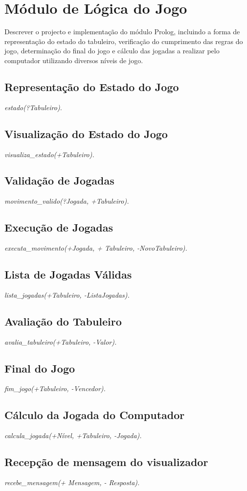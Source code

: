 \documentclass[15pt,a4paper]{article}
\begin{document}
\section{Módulo de Lógica do Jogo}
Descrever o projecto e implementação do módulo Prolog, incluindo a forma de representação do estado do tabuleiro,  verificação do cumprimento das regras do jogo, determinação do final do jogo e cálculo das jogadas a realizar pelo computador  utilizando diversos níveis de jogo.

\subsection{Representação do Estado do Jogo} \textit{estado(?Tabuleiro).}
\subsection{Visualização do Estado do Jogo} \textit{visualiza\_estado(+Tabuleiro).}
\subsection{Validação de Jogadas} \textit{movimento\_valido(?Jogada, +Tabuleiro).}
\subsection{Execução de Jogadas}\textit{executa\_movimento(+Jogada, + Tabuleiro, -NovoTabuleiro).}
\subsection{Lista de Jogadas Válidas}\textit{lista\_jogadas(+Tabuleiro, -ListaJogadas).}
\subsection{Avaliação do Tabuleiro}\textit{avalia\_tabuleiro(+Tabuleiro, -Valor).}
\subsection{Final do Jogo} \textit{fim\_jogo(+Tabuleiro, -Vencedor).}
\subsection{Cálculo da Jogada do Computador}\textit{calcula\_jogada(+Nível, +Tabuleiro, -Jogada).}
\subsection{Recepção de mensagem do visualizador}\textit{recebe\_mensagem(+ Mensagem, - Resposta).}
\end{document}

